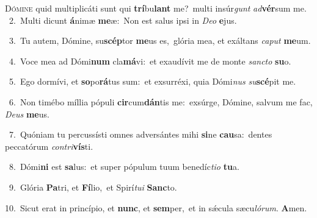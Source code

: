 \lettrine{\initial\textcolor{\initialcolor}{D}}{ómine} quid multiplicáti sunt qui \textbf{trí}\-bu\textbf{lant} me?~\star multi insúr\textit{gunt} \textit{ad}\-\textbf{vér}sum me.\\
{\numbfont\textcolor{\numbcolor}{~2.}}~Multi dicunt \textbf{á}\-nimæ \textbf{me}\-æ:~\star Non est salus ipsi in \textit{De}\-\textit{o} \textbf{e}\-jus.\par
{\numbfont\textcolor{\numbcolor}{~3.}}~Tu autem, Dómine, su\-\textbf{scép}\-tor \textbf{me}\-us es,~\star glória mea, et exáltans \textit{ca}\-\textit{put} \textbf{me}\-um.\par
{\numbfont\textcolor{\numbcolor}{~4.}}~Voce mea ad Dómi\textbf{num} cla\-\textbf{má}\-vi:~\star et exaudívit me de monte \textit{sanc}\-\textit{to} \textbf{su}\-o.\par
{\numbfont\textcolor{\numbcolor}{~5.}}~Ego dormívi, et \textbf{so}\-po\-\textbf{rá}\-tus sum:~\star et exsurréxi, quia Dómi\textit{nus} \textit{su}\-\textbf{scé}pit me.\par
{\numbfont\textcolor{\numbcolor}{~6.}}~Non timébo míllia pópuli \textbf{cir}\-cum\-\textbf{dán}\-tis me:~\star exsúrge, Dómine, salvum me fac, \textit{De}\-\textit{us} \textbf{me}\-us.\par
{\numbfont\textcolor{\numbcolor}{~7.}}~Quóniam tu percussísti omnes adversántes mihi \textbf{si}\-ne \textbf{cau}\-sa:~\star dentes peccatórum \textit{con}\-\textit{tri}\textbf{vís}ti.\par
{\numbfont\textcolor{\numbcolor}{~8.}}~Dómi\textbf{ni} est \textbf{sa}\-lus:~\star et super pópulum tuum benedíc\-\textit{ti}\-\textit{o} \textbf{tu}\-a.\par
{\numbfont\textcolor{\numbcolor}{~9.}}~Glória \textbf{Pa}\-tri, et \textbf{Fí}\-lio,~\star et Spirí\-\textit{tu}\-\textit{i} \textbf{Sanc}\-to.\par
{\numbfont\textcolor{\numbcolor}{10.}}~Sicut erat in princípio, et \textbf{nunc}\-, et \textbf{sem}\-per,~\star et in sǽcula sæcu\-\textit{ló}\-\textit{rum}. \textbf{A}\-men.\par
